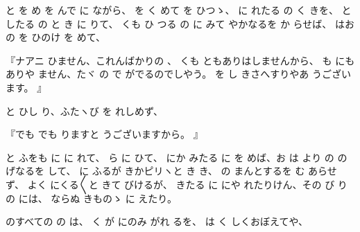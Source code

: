 と
を
め
を
んで
に
ながら、
を
く
めて
を
ひつゝ、
に
れたる
の
く
きを、
としたる
の
と
き
に
りて、
くも
ひ
つる
の
に
みて
やかなるを
か
らせば、
はお
の
を
ひのけ
を
めて、

『ナアニ
ひません、これんばかりの
、
くも
ともありはしませんから、
も
にもありや
ません、たヾ
の
で
がでるのでしやう。
を
し
きさへすりやあ
うございます。
』

と
ひし
り、ふたヽび
を
れしめず、

『でも
でも
りますと
うございますから。
』

と
ふをも
に
に
れて、
ら
に
ひて、
にか
みたる
に
を
めば、お
は
より
の
の
げなるを
して、
に
ふるが
きかピリヽと
き
き、
の
まんとするを
む
あらせず、
よく
にくる〳〵と
きて
びけるが、
きたる
に
にや
れたりけん、その
び
りの
には、
ならぬ
きものゝ
に
えたり。

のすべての
の
は、
く
が
にのみ
がれ
るを、
は
く
しくおぼえてや、

